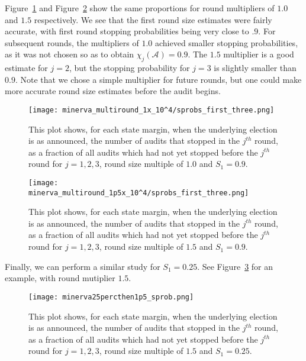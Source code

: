 Figure~\ref{fig:minerva1_sprob} and Figure~\ref{fig:minerva1p5_sprob} show the same proportions for \Minerva round multipliers of $1.0$ and $1.5$ respectively. We see that the first round size estimates were fairly accurate, with first round stopping probabilities being very close to $.9$. For subsequent rounds, the multipliers of $1.0$ achieved smaller stopping probabilities, as it was not chosen so as to obtain $\chi_j({\mathcal A}) = 0.9$. The $1.5$ multiplier is a good estimate for $j=2$, but the stopping probability for $j=3$ is slightly smaller than $0.9$. Note that we chose a simple multiplier for future rounds, but one could make more accurate round size estimates before the audit begins. 

\begin{figure}
\begin{centering}
\texttt{[image: minerva\_multiround\_1x\_10^4/sprobs\_first\_three.png]}
\caption{This plot shows, for each state margin, when the underlying election is as announced, the number of \Minerva audits that stopped in the $j^{th}$ round,
as a fraction of all \Minerva audits which had not yet stopped before the $j^{th}$ round for $j=1,2,3$, round size multiple of $1.0$ and $S_1=0.9$.}
\label{fig:minerva1_sprob}
\end{centering}
\end{figure}

\begin{figure}
\begin{centering}
\texttt{[image: minerva\_multiround\_1p5x\_10^4/sprobs\_first\_three.png]}
\caption{This plot shows, for each state margin, when the underlying election is as announced, the number of \Minerva audits that stopped in the $j^{th}$ round,
as a fraction of all \Minerva audits which had not yet stopped before the $j^{th}$ round for $j=1,2,3$, round size multiple of $1.5$ and $S_1=0.9$.}
\label{fig:minerva1p5_sprob}
\end{centering}
\end{figure}

Finally, we can perform a similar study for $S_1=0.25$. See Figure~\ref{fig:minerva_25} for an example, \Minerva with round mutiplier $1.5$. 

\begin{figure}
\begin{centering}
\texttt{[image: minerva25percthen1p5\_sprob.png]}
\caption{This plot shows, for each state margin, when the underlying election is as announced, the number of \Minerva audits that stopped in the $j^{th}$ round,
as a fraction of all \Minerva audits which had not yet stopped before the $j^{th}$ round for $j=1,2,3$, round size multiple of $1.5$ and $S_1 = 0.25$.}
\label{fig:minerva_25}
\end{centering}
\end{figure}
